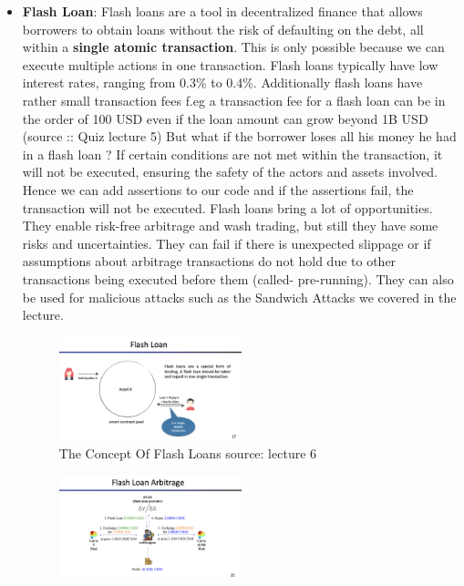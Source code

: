 \documentclass{article}
\begin{document}
\begin{itemize}
\item \textbf{Flash Loan}:
Flash loans are a tool in decentralized finance that allows borrowers to obtain loans without the risk of defaulting on the debt, all within a \textbf{single atomic transaction}. This is only possible because we can execute multiple actions in one transaction. Flash loans typically have low interest rates, ranging from 0.3\% to 0.4\%. Additionally flash loans have rather small transaction fees f.eg a transaction fee for a flash loan can be in the order of 100 USD even if the loan amount can grow beyond 1B USD (source :: Quiz lecture 5) But what if the borrower loses all his money he had in a flash loan ? If certain conditions are not met within the transaction, it will not be executed, ensuring the safety of the actors and assets involved. Hence we can add assertions to our code and if the  assertions fail, the transaction will not be executed. Flash loans bring a lot of opportunities. They enable risk-free arbitrage and wash trading, but still they have some risks and uncertainties. They can fail if there is unexpected slippage or if assumptions about arbitrage transactions do not hold due to other transactions being executed before them (called- pre-running). They can also be used for malicious attacks such as the Sandwich Attacks we covered in the lecture. 
\begin{figure}[h]
    \centering
    \includegraphics[width=0.5\textwidth]{Bildschirmfoto 2024-04-07 um 17.46.08.png} 
    \caption{The Concept Of Flash Loans \scriptsize{source: lecture 6}}
    \label{fig:DoS-attack}
\end{figure}
\begin{figure}[h]
    \centering
    \includegraphics[width=0.5\textwidth]{Bildschirmfoto 2024-04-07 um 17.46.18.png} 

\end{figure}
\end{itemize}
\end{document}

